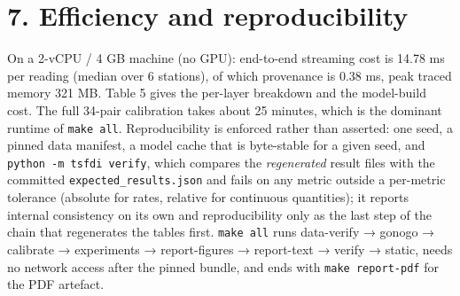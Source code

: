 \documentclass[10pt,a4paper]{article}
\begin{document}
\section*{7. Efficiency and reproducibility}
On a 2-\allowbreak{}vCPU /\allowbreak{} 4 GB machine (no GPU): end-\allowbreak{}to-\allowbreak{}end streaming cost is 14.78 ms per reading (median over 6 stations), of which provenance is 0.38 ms, peak traced memory 321 MB. Table 5 gives the per-\allowbreak{}layer breakdown and the model-\allowbreak{}build cost. The full 34-\allowbreak{}pair calibration takes about 25 minutes, which is the dominant runtime of \texttt{make all}. Reproducibility is enforced rather than asserted: one seed, a pinned data manifest, a model cache that is byte-\allowbreak{}stable for a given seed, and \texttt{python -\allowbreak{}m tsfdi verify}, which compares the \emph{regenerated} result files with the committed \texttt{expected\_\allowbreak{}results.json} and fails on any metric outside a per-\allowbreak{}metric tolerance (absolute for rates, relative for continuous quantities); it reports internal consistency on its own and reproducibility only as the last step of the chain that regenerates the tables first. \texttt{make all} runs data-\allowbreak{}verify → gonogo → calibrate → experiments → report-\allowbreak{}figures → report-\allowbreak{}text → verify → static, needs no network access after the pinned bundle, and ends with \texttt{make report-\allowbreak{}pdf} for the PDF artefact.
\end{document}
